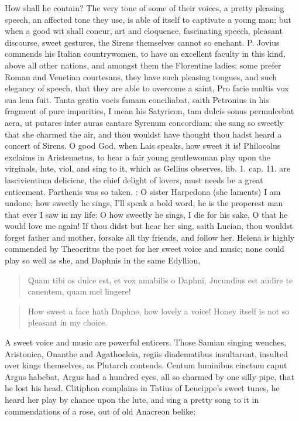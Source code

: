How shall he contain? The very tone of some of their voices, a pretty
pleasing speech, an affected tone they use, is able of itself to
captivate a young man; but when a good wit shall concur, art and
eloquence, fascinating speech, pleasant discourse, sweet gestures, the
Sirens themselves cannot so enchant. P. Jovius commends his
Italian countrywomen, to have an excellent faculty in this kind, above
all other nations, and amongst them the Florentine ladies: some prefer
Roman and Venetian courtesans, they have such pleasing tongues, and
such  elegancy of speech, that they are able to overcome a saint,
Pro facie multis vox sua lena fuit. Tanta gratia vocis famam
conciliabat, saith Petronius in his fragment of pure impurities,
I mean his Satyricon, tam dulcis sonus permulcebat aera, ut putares
inter auras cantare Syrenum concordiam; she sang so sweetly that she
charmed the air, and thou wouldst have thought thou hadst heard a
concert of Sirens. O good God, when Lais speaks, how sweet it is!
Philocolus exclaims in Aristenaetus, to hear a fair young gentlewoman
play upon the virginals, lute, viol, and sing to it, which as Gellius
observes, lib. 1. cap. 11. are lascivientium delicicae, the chief
delight of lovers, must needs be a great enticement. Parthenis was so
taken. : O sister
Harpedona (she laments) I am undone, how sweetly he sings, I'll
speak a bold word, he is the properest man that ever I saw in my life:
O how sweetly he sings, I die for his sake, O that he would love me
again! If thou didst but hear her sing, saith Lucian, thou
wouldst forget father and mother, forsake all thy friends, and follow
her. Helena is highly commended by Theocritus the poet for her
sweet voice and music; none could play so well as she, and Daphnis in
the same Edyllion,

\begin{latin}
\begin{verse}%
Quam tibi os dulce est, et vox amabilis o Daphni,
Jucundius est audire te canentem, quam mel lingere!
\end{verse}%
\end{latin}
\translationrule%
\begin{verse}%
How sweet a face hath Daphne, how lovely a voice!
Honey itself is not so pleasant in my choice.
\end{verse}%

A sweet voice and music are powerful enticers. Those Samian singing
wenches, Aristonica, Onanthe and Agathocleia, regiis diadematibus
insultarunt, insulted over kings themselves, as Plutarch
contends. Centum luminibus cinctum caput Argus habebat, Argus had a
hundred eyes, all so charmed by one silly pipe, that he lost his head.
Clitiphon complains in Tatius of Leucippe's sweet tunes, he heard
her play by chance upon the lute, and sing a pretty song to it in
commendations of a rose, out of old Anacreon belike;

